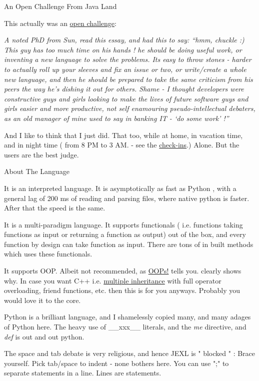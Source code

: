 \begin{subsection}{An Open Challenge From Java Land}

This actually was an \href{http://steve-yegge.blogspot.in/2006/03/execution-in-kingdom-of-nouns.html}{open challenge}:


\emph{A noted PhD from Sun, read this essay, and had this to say: 
``hmm, chuckle :) This guy has too much time on his hands ! he should be doing useful work, or inventing a new language to solve the problems. Its easy to throw stones - harder to actually roll up your sleeves and fix an issue or two, or write/create a whole new language, and then he should be prepared to take the same criticism from his peers the way he's dishing it out for others. Shame - I thought developers were constructive guys and girls looking to make the lives of future software guys and girls easier and more productive, not self enamouring pseudo-intellectual debaters, as an old manager of mine used to say in banking IT - `do some work' !''}


And I like to think that I just did. That too, while at home, in vacation time, and in night time 
( from 8 PM to 3 AM. - see the \href{https://github.com/nmondal/njexl/commits/master}{check-ins}.)
Alone. But the users are the best judge.

\end{subsection}


\begin{subsection}{About The Language}

It is an interpreted language. It is asymptotically as fast as Python , with a general lag of 200 ms of reading and parsing files, where native python is faster. After that the speed is the same.
 
It is a multi-paradigm language. It supports functionals ( i.e. functions taking functions as input or returning a function
as output) out of the box, and every function by design can take function as input. 
There are tons of in built methods which uses these functionals.

It supports OOP. Albeit not recommended, as \href{http://harmful.cat-v.org/software/OO_programming/why_oo_sucks}{OOPs!} tells you.
clearly shows why. In case you want C++ i.e.  \href{http://en.wikipedia.org/wiki/Multiple_inheritance}{multiple inheritance} with full operator overloading, friend functions, etc. then this is for you anyways. 
Probably you would love it to the core.

Python is a brilliant language, and I shamelessly copied many, and many adages of Python here. The heavy use of  \_\_xxx\_\_    
literals, and the \emph{me} directive, and \emph{def} is out and out python. 

The space and tab debate is very religious, and hence JEXL is "{ blocked }" : Brace yourself.
Pick tab/space to indent - none bothers here.
You can use ";" to separate statements in a line. 
Lines are statements.

\end{subsection}

